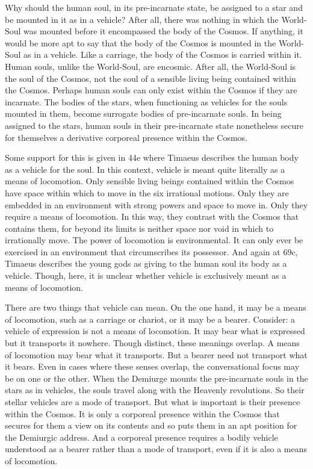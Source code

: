 Why should the human soul, in its pre-incarnate state, be assigned to a star and be mounted in it as in a vehicle? After all, there was nothing in which the World-Soul was mounted before it encompassed the body of the Cosmos. If anything, it would be more apt to say that the body of the Cosmos is mounted in the World-Soul as in a vehicle. Like a carriage, the body of the Cosmos is carried within it. Human souls, unlike the World-Soul, are encosmic. After all, the World-Soul is the soul of the Cosmos, not the soul of a sensible living being contained within the Cosmos. Perhaps human souls can only exist within the Cosmos if they are incarnate. The bodies of the stars, when functioning as vehicles for the souls mounted in them, become surrogate bodies of pre-incarnate souls. In being assigned to the stars, human souls in their pre-incarnate state nonetheless secure for themselves a derivative corporeal presence within the Cosmos. 

Some support for this is given in 44e where Timaeus describes the human body as a vehicle for the soul. In this context, vehicle is meant quite literally as a means of locomotion. Only sensible living beings contained within the Cosmos have space within which to move in the six irrational motions. Only they are embedded in an environment with strong powers and space to move in. Only they require a means of locomotion. In this way, they contrast with the Cosmos that contains them, for beyond its limits is neither space nor void in which to irrationally move. The power of locomotion is environmental. It can only ever be exercised in an environment that circumscribes its possessor. And again at 69c, Timaeus describes the young gods as giving to the human soul its body as a vehicle. Though, here, it is unclear whether vehicle is exclusively meant as a means of locomotion.

There are two things that vehicle can mean. On the one hand, it may be a means of locomotion, such as a carriage or chariot, or it may be a bearer. Consider: a vehicle of expression is not a means of locomotion. It may bear what is expressed but it transports it nowhere. Though distinct, these meanings overlap. A means of locomotion may bear what it transports. But a bearer need not transport what it bears. Even in cases where these senses overlap, the conversational focus may be on one or the other. When the Demiurge mounts the pre-incarnate souls in the stars as in vehicles, the souls travel along with the Heavenly revolutions. So their stellar vehicles are a mode of transport. But what is important is their presence within the Cosmos. It is only a corporeal presence within the Cosmos that secures for them a view on its contents and so puts them in an apt position for the Demiurgic address. And a corporeal presence requires a bodily vehicle understood as a bearer rather than a mode of transport, even if it is also a means of locomotion.

